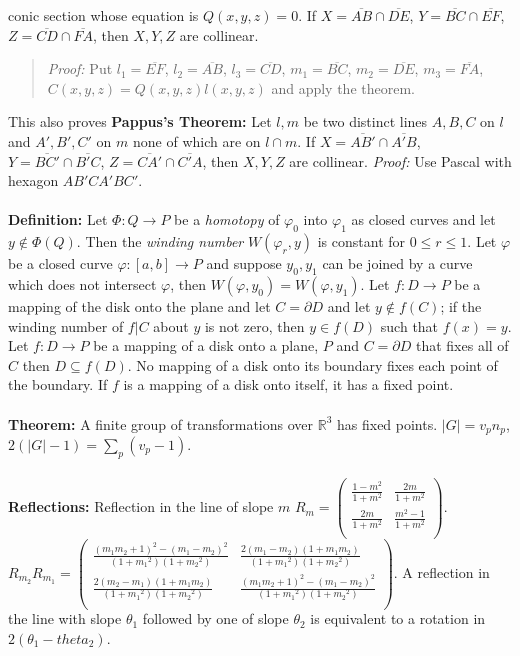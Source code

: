 conic section whose equation is $Q(x,y,z)=0$.  If 
$X= {\overline {AB}} \cap  {\overline {DE}}$,
$Y= {\overline {BC}} \cap  {\overline {EF}}$,
$Z= {\overline {CD}} \cap  {\overline {FA}}$, then $X, Y, Z$ are collinear.  
\begin{quote}
\emph{Proof:}
Put
$l_1 = {\overline {EF}}$,
$l_2 = {\overline {AB}}$,
$l_3 = {\overline {CD}}$,
$m_1 = {\overline {BC}}$,
$m_2 = {\overline {DE}}$,
$m_3 = {\overline {FA}}$, $C(x,y,z)= Q(x,y,z)l(x,y,z)$ and apply the theorem. 
\end{quote}
This also proves {\bf Pappus's Theorem:} Let $l, m$ be two distinct lines $A,B,C$ on $l$ and
$A', B', C'$ on $m$ none of which are on $l \cap m$.  If
$X= {\overline {AB'}} \cap  {\overline {A' B}}$,
$Y= {\overline {BC'}} \cap  {\overline {B'C}}$,
$Z= {\overline {CA'}} \cap  {\overline {C'A}}$, then $X, Y, Z$ are collinear.  \emph{Proof:}
Use Pascal with hexagon $AB'CA'BC'$.
\\
\\
{\bf Definition:}
Let $\Phi: Q \rightarrow P$ be a \emph{homotopy} of $\varphi_0$ into $\varphi_1$ as closed
curves and let $y \notin \Phi(Q)$.  Then the \emph{winding number}
$W(\varphi_r, y)$ is constant
for $0 \le r \le 1$.  Let $\varphi$ be a closed curve $\varphi: [a,b] \rightarrow P$ and
suppose $y_0 , y_1$ can be joined by a curve which does not intersect $\varphi$, then
$W(\varphi, y_0 )= W(\varphi , y_1)$.  Let $f: D \rightarrow P$ be a mapping of
the disk onto the plane and let $C= \partial D$ and let $y \notin f(C)$;
if the winding number
of $f|C$ about $y$ is not zero, then $y \in f(D)$ such that $f(x)=y$.
Let $f: D \rightarrow P$ be a mapping of a disk onto a plane, $P$ and $C= \partial D$
that fixes all of $C$ then $D \subseteq f(D)$.  No mapping of a disk onto its boundary
fixes each point of the boundary.  If $f$ is a mapping of a disk onto itself, it has
a fixed point. 
\\
\\
{\bf Theorem:}
A finite group of transformations over ${\mathbb R}^3$ has fixed points. $|G|= v_p n_p$,
$2(|G| -1) = \sum_p (v_p - 1)$.
\\
\\
{\bf Reflections:}  Reflection in the line of slope $m$
$R_m = 
\left(
\begin{array}{cc}
{\frac {1 - m^2} {1+m^2}} & {\frac {2 m} {1+m^2}} \\
{\frac {2 m} {1+m^2}} & {\frac {m^2 - 1} {1+m^2}} \\
\end{array}
\right)$. \\
$R_{m_2} R_{m_1} = 
\left(
\begin{array}{cc}
{\frac {(m_1 m_2 +1)^2 - (m_1 - m_2)^2} {(1+{m_1}^2) (1+{m_2}^2)}} & 
{\frac {2(m_1 - m_2 )(1+ m_1 m_2)} {(1+{m_1}^2) (1+{m_2}^2)}}  \\
{\frac {2(m_2 - m_1 )(1+ m_1 m_2)} {(1+{m_1}^2) (1+{m_2}^2)}} &
{\frac {(m_1 m_2 +1)^2 - (m_1 - m_2)^2} {(1+{m_1}^2) (1+{m_2}^2)}} \\
\end{array}
\right)$.  A reflection in the line with slope ${\theta_1}$ followed by one of slope ${\theta_2}$ is
equivalent to a rotation in $2(\theta_1 - theta_2)$.
